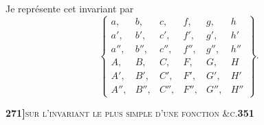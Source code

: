 \documentclass[11pt]{article}
\begin{document}
\medskip

\noindent Je repr\'esente cet invariant par
\[
\left\{\begin{array}{llllll} a, & b, & c, & f, & g, & h\\ a', & b', & c', & f', & g', & h'\\ a'', & b'', & c'', & f'', & g'', & h''\\ A, & B, & C, & F, & G, & H\\ A', & B', & C', & F', & G', & H'\\ A'', & B'', & C'', & F'', & G'', & H''\end{array}\right\}.
\]

\newpage
\setcounter{page}{351}

\noindent\textbf{271]}\hfill\textsc{sur l'invariant le plus simple d'une fonction \&c.}\hfill\textbf{351}

\medskip
\end{document}
